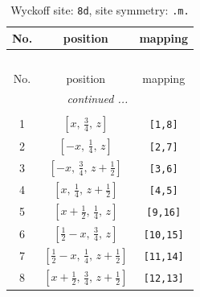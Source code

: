 \documentclass[fleqn,8pt]{jsarticle}
\begin{document}
\begin{longtable}{ccc}
\caption{Wyckoff site: {\tt 8d}, site symmetry: {\tt .m.}}
 \\
 \hline \hline
No. & position & mapping \\ \hline \endfirsthead

\multicolumn{2}{l}{\tablename\ \thetable{}} \\
 \hline \hline
No. & position & mapping \\ \hline \endhead

 \hline \hline
\multicolumn{2}{r}{\footnotesize\it continued ...} \\ \endfoot

 \hline \hline
\multicolumn{2}{r}{} \\ \endlastfoot

1 & $\left[ x,\, \frac{3}{4},\, z \right]$ & {\tt [1,8]} \\ \hline
2 & $\left[ - x,\, \frac{1}{4},\, z \right]$ & {\tt [2,7]} \\ \hline
3 & $\left[ - x,\, \frac{3}{4},\, z + \frac{1}{2} \right]$ & {\tt [3,6]} \\ \hline
4 & $\left[ x,\, \frac{1}{4},\, z + \frac{1}{2} \right]$ & {\tt [4,5]} \\ \hline
5 & $\left[ x + \frac{1}{2},\, \frac{1}{4},\, z \right]$ & {\tt [9,16]} \\ \hline
6 & $\left[ \frac{1}{2} - x,\, \frac{3}{4},\, z \right]$ & {\tt [10,15]} \\ \hline
7 & $\left[ \frac{1}{2} - x,\, \frac{1}{4},\, z + \frac{1}{2} \right]$ & {\tt [11,14]} \\ \hline
8 & $\left[ x + \frac{1}{2},\, \frac{3}{4},\, z + \frac{1}{2} \right]$ & {\tt [12,13]} \\
\end{longtable}
\renewcommand{\arraystretch}{1.2}
\end{document}
